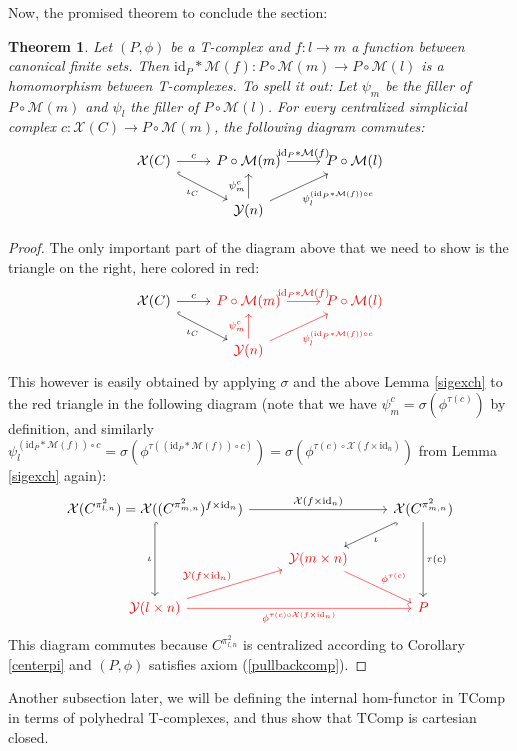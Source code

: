 \documentclass{article}
\newtheorem{theorem}{Theorem}[subsection]
\theoremstyle{remark}
\theoremstyle{definition}
\newcommand{\id}{\mathrm{id}}
\newcommand{\Y}{\mathcal Y}
\newcommand{\X}{\mathcal X}
\newcommand{\TComp}{\mathrm{TComp}}
\newcommand{\M}{\mathcal M}
\begin{document}
	Now, the promised theorem to conclude the section:
	\begin{theorem}
		Let $(P,\phi)$ be a T-complex and $f:l\to m$ a function between canonical finite sets. Then $\id_P*\M(f):P\circ\M(m)\to P\circ\M(l)$ is a homomorphism between T-complexes. To spell it out: Let $\psi_m$ be the filler of $P\circ\M(m)$ and $\psi_l$ the filler of $P\circ\M(l)$. For every centralized simplicial complex $c:\X(C)\to P\circ\M(m)$, the following diagram commutes:
		\[\begin{tikzcd}
			\X(C)\arrow[hook]{dr}[swap]{\iota_C}\arrow{r}{c}&P\circ\M(m)\arrow{r}{\id_P*\M(f)}&P\circ\M(l)\\
			&\Y(n)\arrow{u}{\psi_m^c}\arrow{ur}[swap]{\psi_l^{(\id_P*\M(f))\circ c}}
		\end{tikzcd}\]
	\end{theorem}
	\begin{proof}
		The only important part of the diagram above that we need to show is the triangle on the right, here colored in red:
		\[\begin{tikzcd}
			\X(C)\arrow[hook]{dr}[swap]{\iota_C}\arrow{r}{c}&\color{red}{P\circ\M(m)}\arrow[color=red]{r}{\id_P*\M(f)}&\color{red}{P\circ\M(l)}\\
			&\color{red}{\Y(n)}\arrow[color=red]{u}{\psi_m^c}\arrow[color=red]{ur}[swap]{\psi_l^{(\id_P*\M(f))\circ c}}
		\end{tikzcd}\]
		This however is easily obtained by applying $\sigma$ and the above Lemma \ref{sigexch} to the red triangle in the following diagram (note that we have $\psi_m^c=\sigma(\phi^{\tau(c)})$ by definition, and similarly $\psi_l^{(\id_P*\M(f))\circ c}=\sigma(\phi^{\tau((\id_P*\M(f))\circ c)})=\sigma(\phi^{\tau(c)\circ\X(f\times\id_n)})$ from Lemma \ref{sigexch} again):
		\[\begin{tikzcd}
			\X(C^{\pi^2_{l,n}})=\X((C^{\pi^2_{m,n}})^{f\times\id_n})
			\arrow[hook]{dd}[swap]{\iota}
			\arrow{rr}{\X(f\times\id_n)}
			&&
			\X(C^{\pi^2_{m,n}})
			\arrow[hook]{ld}{\iota}
			\arrow{dd}{\tau(c)}
			\\&
			\color{red}{\Y(m\times n)}
			\arrow[color=red]{dr}{\phi^{\tau(c)}}
			\\
			\color{red}{\Y(l\times n)}
			\arrow[color=red]{ur}{\Y(f\times\id_n)}
			\arrow[color=red]{rr}[swap]{\phi^{\tau(c)\circ\X(f\times\id_n)}}
			&&
			\color{red}P
		\end{tikzcd}\]
		This diagram commutes because $C^{\pi^2_{l,n}}$ is centralized according to Corollary \ref{centerpi} and $(P,\phi)$ satisfies axiom (\ref{pullbackcomp}).
	\end{proof}
	Another subsection later, we will be defining the internal hom-functor in $\TComp$ in terms of polyhedral T-complexes, and thus show that $\TComp$ is cartesian closed.
\end{document}
